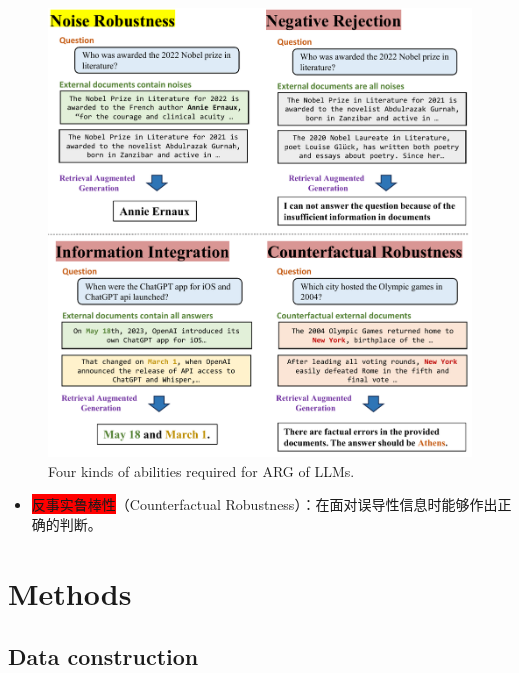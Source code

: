 \documentclass{beamer}
\begin{document}
\begin{frame}
    \begin{figure}[h]
        \centering
        \includegraphics[height=.75\textheight]{./images/figures/intro.pdf}
        \caption{Four kinds of abilities required for ARG of LLMs.}
    \end{figure}
    \begin{itemize}
        \item {\colorbox{red}{反事实鲁棒性}（Counterfactual Robustness）：在面对误导性信息时能够作出正确的判断。}
    \end{itemize}
\end{frame}

\section{Methods}

\subsection{Data construction}
\end{document}
